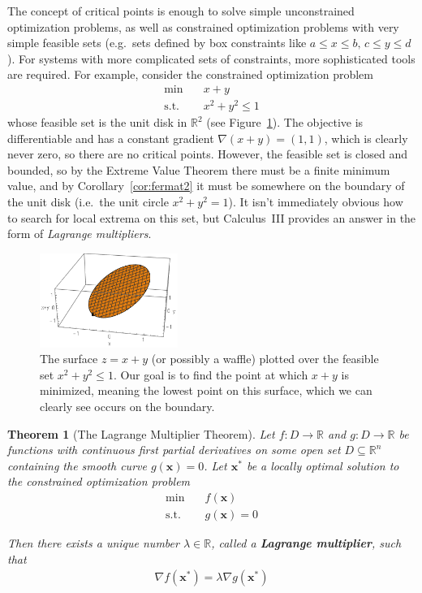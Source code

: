 \documentclass[11pt]{article}
\newtheorem{theorem}{Theorem}[section] %
\theoremstyle{definition} %
\begin{document}
The concept of critical points is enough to solve simple unconstrained optimization problems, as well as constrained optimization problems with very simple feasible sets (e.g.~sets defined by box constraints like $a \le x \le b, \, c \le y \le d$). For systems with more complicated sets of constraints, more sophisticated tools are required. For example, consider the constrained optimization problem
\begin{align*}
	\min \quad& x + y \\
	\mathrm{s.t.} \quad& x^2 + y^2 \le 1
\end{align*}
whose feasible set is the unit disk in $\mathbb{R}^2$ (see Figure~\ref{fig:constrainedopt}). The objective is differentiable and has a constant gradient $\nabla (x+y) = (1,1)$, which is clearly never zero, so there are no critical points. However, the feasible set is closed and bounded, so by the Extreme Value Theorem there must be a finite minimum value, and by Corollary~\ref{cor:fermat2} it must be somewhere on the boundary of the unit disk (i.e.~the unit circle $x^2 + y^2 = 1$). It isn't immediately obvious how to search for local extrema on this set, but Calculus~III provides an answer in the form of \textit{Lagrange multipliers}.

\begin{figure}[h]
	\centering
	\includegraphics[width=0.4\textwidth]{figures/constrainedopt01.png}
	\caption{The surface $z = x+y$ (or possibly a waffle) plotted over the feasible set $x^2 + y^2 \le 1$. Our goal is to find the point at which $x+y$ is minimized, meaning the lowest point on this surface, which we can clearly see occurs on the boundary.}
	\label{fig:constrainedopt}
\end{figure}

\begin{theorem}[The Lagrange Multiplier Theorem]
\label{thm:lagrange}
	Let $f : D \to \mathbb{R}$ and $g : D \to \mathbb{R}$ be functions with continuous first partial derivatives on some open set $D \subseteq \mathbb{R}^n$ containing the smooth curve $g(\mathbf{x}) = 0$. Let $\mathbf{x^{\boldsymbol{*}}}$ be a locally optimal solution to the constrained optimization problem
	\begin{align*}
		\min \quad& f(\mathbf{x}) \\
		\mathrm{s.t.} \quad& g(\mathbf{x}) = 0
	\end{align*}
	
	Then there exists a unique number $\lambda \in \mathbb{R}$, called a \textbf{Lagrange multiplier}, such that
	\begin{align*}
		\nabla f(\mathbf{x^{\boldsymbol{*}}}) = \lambda \nabla g(\mathbf{x^{\boldsymbol{*}}})
	\end{align*}
\end{theorem}
\end{document}
